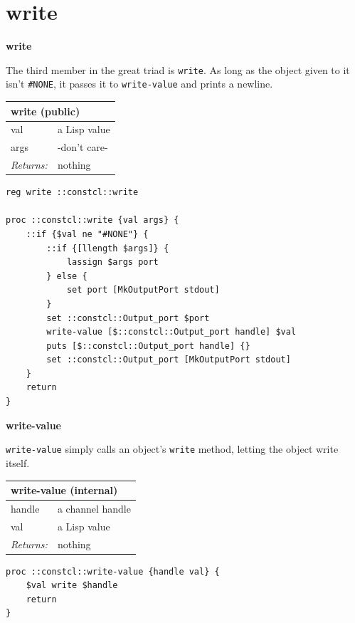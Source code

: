 \documentclass[twoside,9pt]{report}
\begin{document}
\section{write}
\label{write}

\textbf{write}


The third member in the great triad is \texttt{write}. As long as the object given to it isn't \texttt{\#NONE}, it passes it to \texttt{write-value} and prints a newline.

\begin{tabular}{ |l l| }
\hline
\multicolumn{2}{|l|}{write (public)} \\
\hline
val & a Lisp value \\
args & -don't care- \\
\textit{Returns:} & nothing \\
\hline
\end{tabular}

\noindent\makebox[\linewidth]{\rule{\linewidth}{0.4pt}}
\begin{lstlisting}
reg write ::constcl::write
 
proc ::constcl::write {val args} {
    ::if {$val ne "#NONE"} {
        ::if {[llength $args]} {
            lassign $args port
        } else {
            set port [MkOutputPort stdout]
        }
        set ::constcl::Output_port $port
        write-value [$::constcl::Output_port handle] $val
        puts [$::constcl::Output_port handle] {}
        set ::constcl::Output_port [MkOutputPort stdout]
    }
    return
}
\end{lstlisting}
\noindent\makebox[\linewidth]{\rule{\linewidth}{0.4pt}}

\textbf{write-value}


\texttt{write-value} simply calls an object's \texttt{write} method, letting the object write itself.

\begin{tabular}{ |l l| }
\hline
\multicolumn{2}{|l|}{write-value (internal)} \\
\hline
handle & a channel handle \\
val & a Lisp value \\
\textit{Returns:} & nothing \\
\hline
\end{tabular}

\noindent\makebox[\linewidth]{\rule{\linewidth}{0.4pt}}
\begin{lstlisting}
proc ::constcl::write-value {handle val} {
    $val write $handle
    return
}
\end{lstlisting}
\noindent\makebox[\linewidth]{\rule{\linewidth}{0.4pt}}
\end{document}
